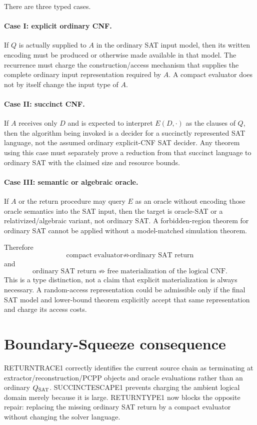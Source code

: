 \documentclass[11pt]{article}
\begin{document}
There are three typed cases.

\paragraph{Case I: explicit ordinary CNF.}
If $Q$ is actually supplied to $A$ in the ordinary SAT input model, then its written encoding must be produced or otherwise made available in that model. The recurrence must charge the construction/access mechanism that supplies the complete ordinary input representation required by $A$. A compact evaluator does not by itself change the input type of $A$.

\paragraph{Case II: succinct CNF.}
If $A$ receives only $D$ and is expected to interpret $E(D,\cdot)$ as the clauses of $Q$, then the algorithm being invoked is a decider for a succinctly represented SAT language, not the assumed ordinary explicit-CNF SAT decider. Any theorem using this case must separately prove a reduction from that succinct language to ordinary SAT with the claimed size and resource bounds.

\paragraph{Case III: semantic or algebraic oracle.}
If $A$ or the return procedure may query $E$ as an oracle without encoding those oracle semantics into the SAT input, then the target is oracle-SAT or a relativized/algebraic variant, not ordinary SAT. A forbidden-region theorem for ordinary SAT cannot be applied without a model-matched simulation theorem.

Therefore
\[
\boxed{\text{compact evaluator}\not\Rightarrow\text{ordinary SAT return}}
\]
and
\[
\boxed{\text{ordinary SAT return}\not\Rightarrow\text{free materialization of the logical CNF}.}
\]
This is a type distinction, not a claim that explicit materialization is always necessary. A random-access representation could be admissible only if the final SAT model and lower-bound theorem explicitly accept that same representation and charge its access costs.

\section*{Boundary-Squeeze consequence}
RETURNTRACE1 correctly identifies the current source chain as terminating at extractor/reconstruction/PCPP objects and oracle evaluations rather than an ordinary $Q_{\rm SAT}$. SUCCINCTESCAPE1 prevents charging the ambient logical domain merely because it is large. RETURNTYPE1 now blocks the opposite repair: replacing the missing ordinary SAT return by a compact evaluator without changing the solver language.
\end{document}
